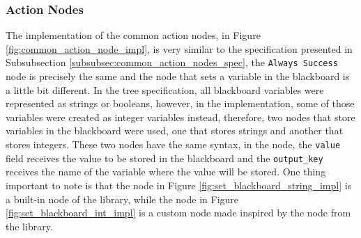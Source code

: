 \subsubsection{Action Nodes}

The implementation of the common action nodes, in Figure \ref{fig:common_action_node_impl}, is very similar to the specification presented in Subsubsection \ref{subsubsec:common_action_nodes_spec}, the \texttt{Always Success} node is precisely the same and the node that sets a variable in the blackboard is a little bit different. In the tree specification, all blackboard variables were represented as strings or booleans, however, in the implementation, some of those variables were created as integer variables instead, therefore, two nodes that store variables in the blackboard were used, one that stores strings and another that stores integers. These two nodes have the same syntax, in the node, the \texttt{value} field receives the value to be stored in the blackboard and the \texttt{output\_key} receives the name of the variable where the value will be stored. One thing important to note is that the node in Figure \ref{fig:set_blackboard_string_impl} is a built-in node of the library, while the node in Figure \ref{fig:set_blackboard_int_impl} is a custom node made inspired by the node from the library.

